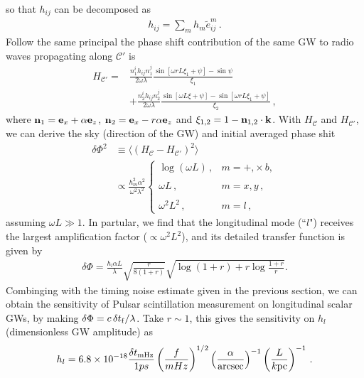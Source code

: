 \documentclass[prl,aps,floatfix,superscriptaddress,twocolumn]{revtex4}
\begin{document}
so that $h_{ij}$ can be decomposed as 
\begin{align}
h_{ij} = \sum_{m} h_m \tilde{e}^m_{ij}\,.
\end{align}  
Follow the same principal the phase shift contribution of the same GW to radio waves propagating along $\mathcal{C}'$ is
\begin{align}\label{eqcp}
H_{\mathcal{C}'}= &\frac{n_1^i h_{ij} n_1^j}{2\omega \lambda} \frac{\sin [\omega r L \xi_1+\psi]-\sin \psi}{\xi_1}\nonumber\\
&+\frac{n_2^i h_{ij} n_2^j}{2\omega \lambda} \frac{\sin [\omega L \xi+\psi]-\sin [\omega r L \xi_1+\psi]}{\xi_2}\,,
\end{align}
where ${\bf n}_1={\bf e}_x+\alpha {\bf e}_z$, ${\bf n}_2 ={\bf e}_x-r \alpha  {\bf e}_z$ and $\xi_{1,2}=1-{\bf n}_{1,2} \cdot {\bf k}$. With $H_{\mathcal{C}}$ and $H_{\mathcal{C}'}$, we can derive the sky (direction of the GW) and initial averaged phase shit
\begin{align}
\delta \Phi^2 &\equiv \langle (H_{\mathcal{C}}-H_{\mathcal{C}'})^2\rangle \nonumber \\
&\propto  \frac{h^2_m \alpha^2}{\omega^2 \lambda^2} \left\{
\begin{array}{cl}
 \log(\omega L)\,, & m=+, \times\, b, \\
\\
 \omega L\,, & m =x, y\,, \\
\\
\omega^2L^2\,, & m=l\,,
\end{array}\right.
\label{bx}
\end{align}
assuming $\omega L \gg 1$. In partular, we find that the longitudinal mode (``$l$") receives the largest amplification factor ($\propto \omega^2 L^2$), and its detailed transfer function is given by
\begin{align}
\delta \Phi =\frac{h_l \alpha L}{\lambda}\sqrt{\frac{r}{8(1+r)}} \sqrt{ \log (1+r)+r\log \frac{1+r}{r}}.
\end{align}
Combinging with the timing noise estimate given in the previous section, we can obtain the sensitivity of Pulsar scintillation measurement on longitudinal scalar GWs, by making $\delta \Phi =c\, \delta t_{\rm f}/\lambda$. Take $r \sim 1$, this gives the sensitivity on $h_l$ (dimensionless GW amplitude) as
\begin{align}
h_l = 6.8\times 10^{-18}  \frac{\delta t_{\rm mHz}}{1 ps}   \left (\frac{f}{ m Hz} \right )^{1/2} \left (\frac{\alpha}{{\rm arcsec}} \right )^{-1} \left ( \frac{L}{k {\rm pc}}\right)^{-1}\,.
\end{align}
\end{document}
